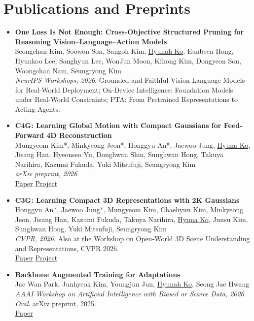 \documentclass[letterpaper,11pt]{article}
\begin{document}
\section{Publications and Preprints}
\begin{itemize}[leftmargin=*]
\item \small{\textbf{One Loss Is Not Enough: Cross-Objective Structured Pruning for Reasoning Vision--Language--Action Models}\\
Seongchan Kim, Soowon Son, Sangoh Kim, \underline{Hyunah Ko}, Eunbeen Hong, Hyunkoo Lee, Sanghyun Lee, WonJun Moon, Kihong Kim, Dongyeon Son, Woongchan Nam, Seungryong Kim\\
\textit{NeurIPS Workshops, 2026}. Grounded and Faithful Vision-Language Models for Real-World Deployment; On-Device Intelligence: Foundation Models under Real-World Constraints; PTA: From Pretrained Representations to Acting Agents.}

\item \small{\textbf{C4G: Learning Global Motion with Compact Gaussians for Feed-Forward 4D Reconstruction}\\
Mungyeom Kim*, Minkyeong Jeon*, Honggyu An*, Jaewoo Jung, \underline{Hyuna Ko}, Jisang Han, Hyeonseo Yu, Donghwan Shin, Sunghwan Hong, Takuya Narihira, Kazumi Fukuda, Yuki Mitsufuji, Seungryong Kim\\
\textit{arXiv preprint, 2026}.\\
\href{https://arxiv.org/abs/2605.31595}{Paper} \quad \href{https://cvlab-kaist.github.io/C4G/}{Project}}

\item \small{\textbf{C3G: Learning Compact 3D Representations with 2K Gaussians}\\
Honggyu An*, Jaewoo Jung*, Mungyeom Kim, Chaehyun Kim, Minkyeong Jeon, Jisang Han, Kazumi Fukuda, Takuya Narihira, \underline{Hyuna Ko}, Junsu Kim, Sunghwan Hong, Yuki Mitsufuji, Seungryong Kim\\
\textit{CVPR, 2026}. Also at the Workshop on Open-World 3D Scene Understanding and Representations, CVPR 2026.\\
\href{https://arxiv.org/abs/2512.04021}{Paper} \quad \href{https://cvlab-kaist.github.io/C3G/}{Project}}

\item \small{\textbf{Backbone Augmented Training for Adaptations}\\
Jae Wan Park, Junhyeok Kim, Youngjun Jun, \underline{Hyunah Ko}, Seong Jae Hwang\\
\textit{AAAI Workshop on Artificial Intelligence with Biased or Scarce Data, 2026 \textbullet{} Oral}. arXiv preprint, 2025.\\
\href{https://arxiv.org/abs/2506.04288}{Paper}}


\end{itemize}
\end{document}
